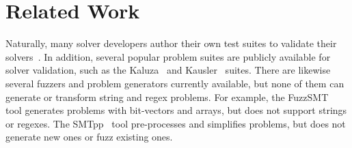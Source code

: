 \section{Related Work}

Naturally, many solver developers author their own test suites to
validate their solvers~\cite{cvc4-tests,z3str3-tests,z3str2-tests}. In
addition, several popular problem suites are publicly available for
solver validation, such as the Kaluza~\cite{kaluza} and
Kausler~\cite{kausler} suites. There are likewise several fuzzers and
problem generators currently available, but none of them can generate
or transform string and regex problems. For example, the
FuzzSMT~\cite{fuzzsmt} tool generates \smt{} problems with bit-vectors
and arrays, but does not support strings or regexes. The
SMTpp~\cite{smtpp} tool pre-processes and simplifies problems, but
does not generate new ones or fuzz existing ones.
